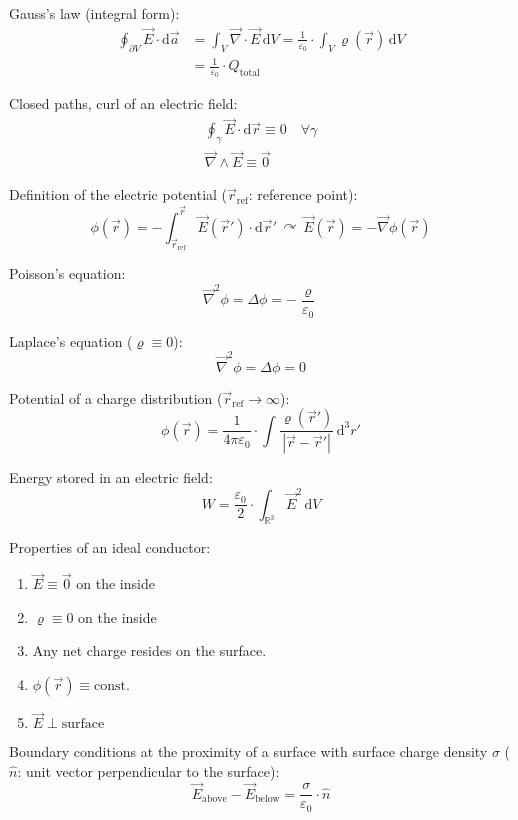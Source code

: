 \documentclass[fontsize=11pt,a4paper]{scrartcl}
\begin{document}
Gauss's law (integral form):
\begin{equation*}
\begin{split}
	\oint_{\partial V}\vec E\cdot\mathrm{d}\vec a &= \int_V\vec\nabla\cdot\vec E\,\mathrm{d}V = \frac{1}{\varepsilon_0}\cdot\int_V\varrho(\vec r)\,\mathrm{d}V\\
	                                              &= \frac{1}{\varepsilon_0}\cdot Q_\mathrm{total}
\end{split}
\end{equation*}

Closed paths, curl of an electric field:
\begin{gather*}
		\oint_\gamma\vec E\cdot\mathrm{d}\vec r\equiv 0\quad\forall\gamma\\
		\vec\nabla\wedge\vec E\equiv\vec 0
\end{gather*}

Definition of the electric potential ($\vec r_\mathrm{ref}$: reference point):
\begin{equation*}
	\phi(\vec r)=-\int_{\vec r_\mathrm{ref}}^{\vec r}\vec E(\vec r')\cdot\mathrm{d}\vec r'\,\curvearrowright\,\vec E(\vec r)=-\vec\nabla\phi(\vec r)
\end{equation*}

Poisson's equation:
\[
	\vec\nabla^2\phi=\Delta\phi=-\frac{\varrho}{\varepsilon_0}
\]

Laplace's equation ($\varrho\equiv 0$):
\[
	\vec\nabla^2\phi=\Delta\phi=0
\]

Potential of a charge distribution ($\vec r_\mathrm{ref}\to\infty$):
\[
	\phi(\vec r)=\frac{1}{4\pi\varepsilon_0}\cdot\int\frac{\varrho(\vec r')}{|\vec r-\vec r'|}\,\mathrm{d}^3 r'
\]

Energy stored in an electric field:
\[
	W=\frac{\varepsilon_0}{2}\cdot\int_{\mathbb{R}^3}\vec E^2\,\mathrm{d}V
\]

Properties of an ideal conductor:
\begin{enumerate}
	\item $\vec E\equiv\vec 0$ on the inside
	\item $\varrho\equiv 0$ on the inside
	\item Any net charge resides on the surface.
	\item $\phi(\vec r)\equiv\text{const.}$
	\item $\vec E\perp \text{surface}$
\end{enumerate}

Boundary conditions at the proximity of a surface with surface charge density $\sigma$ ($\hat n$: unit vector perpendicular to the surface):
\[
	\vec E_\mathrm{above}-\vec E_\mathrm{below}=\frac{\sigma}{\varepsilon_0}\cdot\hat n
\]
\end{document}
